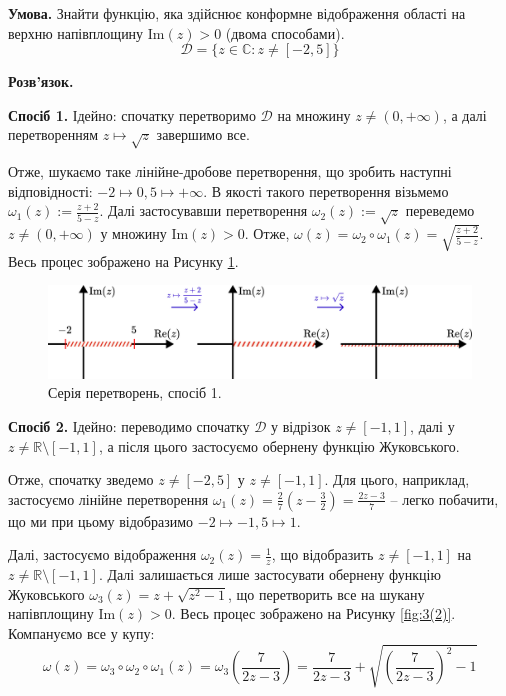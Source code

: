 \documentclass[oneside,solution]{karazin-complan-assign}
\begin{document}

\hspace{20px}\textbf{Умова.} Знайти функцію, яка здійснює конформне відображення області на верхню напівплощину $\text{Im}(z) > 0$ (двома способами).
\begin{equation}
    \mathcal{D} = \{z \in \mathbb{C}: z \neq [-2, 5]\}
\end{equation}

\textbf{Розв'язок.}

\textbf{Спосіб 1.} Ідейно: спочатку перетворимо $\mathcal{D}$ на множину $z \neq (0,+\infty)$, а далі перетворенням $z \mapsto \sqrt{z}$ завершимо все.

Отже, шукаємо таке лінійне-дробове перетворення, що зробить наступні відповідності: $-2 \mapsto 0, 5 \mapsto +\infty$. В якості такого перетворення візьмемо $\omega_1(z) := \frac{z+2}{5-z}$. Далі застосувавши перетворення $\omega_2(z) := \sqrt{z}$ переведемо $z \neq (0,+\infty)$ у множину $\text{Im}(z) > 0$. Отже, $\omega(z) = \omega_2 \circ \omega_1(z) = \sqrt{\frac{z+2}{5-z}}$. Весь процес зображено на Рисунку \ref{fig:3(1)}.

\begin{figure}
    \centering
    \includegraphics[width=\textwidth]{images/hw_5/problem_3(1).pdf}
    \caption{Серія перетворень, спосіб 1.}
    \label{fig:3(1)}
\end{figure}

\textbf{Спосіб 2.} Ідейно: переводимо спочатку $\mathcal{D}$ у відрізок $z\neq[-1,1]$, далі у $z \neq \mathbb{R} \setminus [-1,1]$, а після цього застосуємо обернену функцію Жуковського.

Отже, спочатку зведемо $z\neq[-2,5]$ у $z \neq [-1,1]$. Для цього, наприклад, застосуємо лінійне перетворення $\omega_1(z) = \frac{2}{7}\left(z-\frac{3}{2}\right)=\frac{2z-3}{7}$ -- легко побачити, що ми при цьому відобразимо $-2 \mapsto -1, 5 \mapsto 1$. 

Далі, застосуємо відображення $\omega_2(z) = \frac{1}{z}$, що відобразить $z \neq [-1,1]$ на $z \neq \mathbb{R}\setminus [-1,1]$. Далі залишається лише застосувати обернену функцію Жуковського $\omega_3(z) = z+\sqrt{z^2-1}$, що перетворить все на шукану напівплощину $\text{Im}(z)>0$. Весь процес зображено на Рисунку \ref{fig:3(2)}. Компануємо все у купу:
\begin{equation}
    \omega(z) = \omega_3 \circ \omega_2 \circ \omega_1(z) = \omega_3\left(\frac{7}{2z-3}\right) = \frac{7}{2z-3} + \sqrt{\left(\frac{7}{2z-3}\right)^2-1}
\end{equation}
\end{document}
